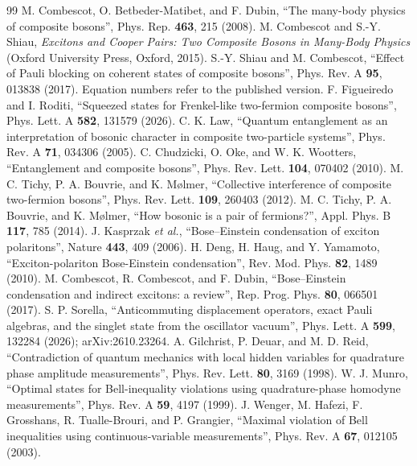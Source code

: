 \documentclass[11pt,a4paper]{article}
\begin{document}
\begin{thebibliography}{99}
 M. Combescot, O. Betbeder-Matibet, and F. Dubin, ``The many-body physics of composite bosons'', Phys. Rep. \textbf{463}, 215 (2008).
 M. Combescot and S.-Y. Shiau, \emph{Excitons and Cooper Pairs: Two Composite Bosons in Many-Body Physics} (Oxford University Press, Oxford, 2015).
 S.-Y. Shiau and M. Combescot, ``Effect of Pauli blocking on coherent states of composite bosons'', Phys. Rev. A \textbf{95}, 013838 (2017). Equation numbers refer to the published version.
 F. Figueiredo and I. Roditi, ``Squeezed states for Frenkel-like two-fermion composite bosons'', Phys. Lett. A \textbf{582}, 131579 (2026).
 C. K. Law, ``Quantum entanglement as an interpretation of bosonic character in composite two-particle systems'', Phys. Rev. A \textbf{71}, 034306 (2005).
 C. Chudzicki, O. Oke, and W. K. Wootters, ``Entanglement and composite bosons'', Phys. Rev. Lett. \textbf{104}, 070402 (2010).
 M. C. Tichy, P. A. Bouvrie, and K. M\o lmer, ``Collective interference of composite two-fermion bosons'', Phys. Rev. Lett. \textbf{109}, 260403 (2012).
 M. C. Tichy, P. A. Bouvrie, and K. M\o lmer, ``How bosonic is a pair of fermions?'', Appl. Phys. B \textbf{117}, 785 (2014).
 J. Kasprzak \emph{et al.}, ``Bose--Einstein condensation of exciton polaritons'', Nature \textbf{443}, 409 (2006).
 H. Deng, H. Haug, and Y. Yamamoto, ``Exciton-polariton Bose-Einstein condensation'', Rev. Mod. Phys. \textbf{82}, 1489 (2010).
 M. Combescot, R. Combescot, and F. Dubin, ``Bose--Einstein condensation and indirect excitons: a review'', Rep. Prog. Phys. \textbf{80}, 066501 (2017).
 S. P. Sorella, ``Anticommuting displacement operators, exact Pauli algebras, and the singlet state from the oscillator vacuum'', Phys. Lett. A \textbf{599}, 132284 (2026); arXiv:2610.23264.
 A. Gilchrist, P. Deuar, and M. D. Reid, ``Contradiction of quantum mechanics with local hidden variables for quadrature phase amplitude measurements'', Phys. Rev. Lett. \textbf{80}, 3169 (1998).
 W. J. Munro, ``Optimal states for Bell-inequality violations using quadrature-phase homodyne measurements'', Phys. Rev. A \textbf{59}, 4197 (1999).
 J. Wenger, M. Hafezi, F. Grosshans, R. Tualle-Brouri, and P. Grangier, ``Maximal violation of Bell inequalities using continuous-variable measurements'', Phys. Rev. A \textbf{67}, 012105 (2003).

\end{thebibliography}
\end{document}
